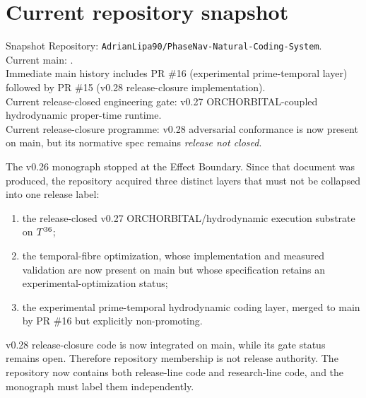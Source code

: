 \chapter{Current repository snapshot}

\begin{statusbox}{Snapshot}
Repository: \texttt{AdrianLipa90/PhaseNav-Natural-Coding-System}.\\
Current main: .\\
Immediate main history includes PR \#16 (experimental prime-temporal layer) followed by PR \#15 (v0.28 release-closure implementation).\\
Current release-closed engineering gate: v0.27 ORCHORBITAL-coupled hydrodynamic proper-time runtime.\\
Current release-closure programme: v0.28 adversarial conformance is now present on main, but its normative spec remains \emph{release not closed}.
\end{statusbox}

The v0.26 monograph stopped at the Effect Boundary. Since that document was produced, the repository acquired three distinct layers that must not be collapsed into one release label:

\begin{enumerate}
\item the release-closed v0.27 ORCHORBITAL/hydrodynamic execution substrate on \(T^{36}\);
\item the temporal-fibre optimization, whose implementation and measured validation are now present on main but whose specification retains an experimental-optimization status;
\item the experimental prime-temporal hydrodynamic coding layer, merged to main by PR \#16 but explicitly non-promoting.
\end{enumerate}

v0.28 release-closure code is now integrated on main, while its gate status remains open. Therefore repository membership is not release authority. The repository now contains both release-line code and research-line code, and the monograph must label them independently.


